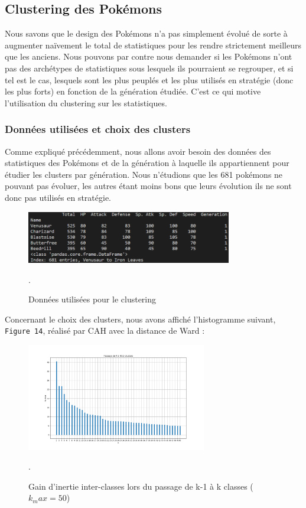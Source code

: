 \documentclass[a4paper,12pt]{article}
\begin{document}
\subsection{Clustering des Pokémons}
Nous savons que le design des Pokémons n'a pas simplement évolué de sorte à
augmenter naïvement le total de statistiques pour les rendre strictement
meilleurs que les anciens. Nous pouvons par contre nous demander si les Pokémons
n'ont pas des archétypes de statistiques sous lesquels ils pourraient se
regrouper, et si tel est le cas, lesquels sont les plus peuplés et les plus
utilisés en stratégie (donc les plus forts) en fonction de la génération
étudiée. C'est ce qui motive l'utilisation du clustering sur les statistiques.

\subsubsection{Données utilisées et choix des clusters}
Comme expliqué précédemment, nous allons avoir besoin des données des
statistiques des Pokémons et de la génération à laquelle ils appartiennent pour
étudier les clusters par génération. Nous n'étudions que les 681 pokémons ne
pouvant pas évoluer, les autres étant moins bons que leurs évolution ils ne sont
donc pas utilisés en stratégie.

\begin{figure}[h]
    \centering
    \includegraphics[width=0.8\textwidth]{Clustering/stats_gen_infos.png}
    \caption{Données utilisées pour le clustering}.
\end{figure}

Concernant le choix des clusters, nous avons affiché l'histogramme suivant,
\texttt{Figure 14}, réalisé par CAH avec la distance de Ward : 

\begin{figure}[h]
    \centering
    \includegraphics[width=0.7\textwidth]{Clustering/heights_k_clustering_zoomed.png}
    \caption{Gain d'inertie inter-classes lors du passage de k-1 à k classes
    ($k_max = 50$)}.
\end{figure}
\end{document}

